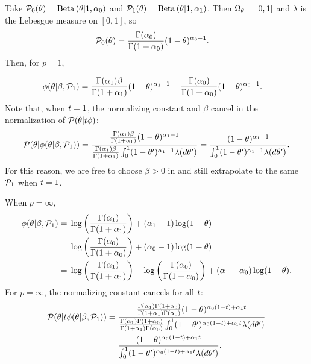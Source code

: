 \begin{ex}
%
Take $\mathcal{P}_{0}(\theta) = \mathrm{Beta}\left(\theta \vert 1, \alpha_0\right)$ and
$\mathcal{P}_{1}(\theta) = \mathrm{Beta}\left(\theta \vert 1, \alpha_1\right)$.  Then
$\Omega_{\theta}=[0,1]$ and $\lambda$ is the Lebesgue measure on $[0,1]$, so
%
\begin{align*}
%
\pbase(\theta) ={}&
    \frac{\Gamma(\alpha_0)}{\Gamma(1 + \alpha_0)} (1 - \theta)^{\alpha_0 - 1}.
%
\end{align*}
%
Then, for $p = 1$,

\begin{align*}
%
\phi(\theta \vert \beta, \palt) ={}&
    \frac{\Gamma(\alpha_1)\beta}{\Gamma(1 + \alpha_1)} (1 - \theta)^{\alpha_1 - 1} -
    \frac{\Gamma(\alpha_0)}{\Gamma(1 + \alpha_0)}
        (1 - \theta)^{\alpha_0 - 1}.
%
\end{align*}
%
Note that, when $t = 1$, the normalizing constant and $\beta$ cancel in the
normalization of $\mathcal{P}(\theta \vert t \phi)$:
%
\begin{align*}
%
\p(\theta \vert \phi(\theta \vert \beta, \palt)) =
\frac{\frac{\Gamma(\alpha_1)\beta}{\Gamma(1 + \alpha_1)} (1 - \theta)^{\alpha_1 - 1}}
     {\frac{\Gamma(\alpha_1)\beta}{\Gamma(1 + \alpha_1)}
       \int_0^1 (1 - \theta')^{\alpha_1 - 1} \lambda(d\theta')}
=
\frac{(1 - \theta)^{\alpha_1 - 1}}
     {\int_0^1 (1 - \theta')^{\alpha_1 - 1} \lambda(d\theta')}.
%
\end{align*}
%
For this reason, we are free to choose $\beta > 0$ in 
and still extrapolate to the same $\mathcal{P}_{1}$ when $t = 1$.

When $p = \infty$,
%
\begin{align*}
%
\phi(\theta \vert \beta, \palt) ={}&
    \log \left(
        \frac{\Gamma(\alpha_1) }{\Gamma(1 + \alpha_1)}
    \right)  + (\alpha_1 - 1) \log (1 - \theta) - \\
{}&
    \log \left(
        \frac{\Gamma(\alpha_0)}{\Gamma(1 + \alpha_0)}
    \right) + (\alpha_0 - 1) \log (1 - \theta) \\
={}&
\log \left(
    \frac{\Gamma(\alpha_1) }{\Gamma(1 + \alpha_1)}
\right) -
\log \left(
    \frac{\Gamma(\alpha_0)}{\Gamma(1 + \alpha_0)}
\right) + (\alpha_1 - \alpha_0) \log(1 - \theta).
%
\end{align*}
%
For $p = \infty$, the normalizing constant cancels for all $t$:
%
\begin{align*}
%
\p(\theta \vert \t \phi(\theta \vert \beta, \palt)) ={}&
\frac{    \frac{\Gamma(\alpha_1) \Gamma(1 + \alpha_0) }
               {\Gamma(1 + \alpha_1) \Gamma(\alpha_0)}
        (1-\theta)^{\alpha_0 (1 - \t) + \alpha_1 \t}
    }
     {
     \frac{\Gamma(\alpha_1) \Gamma(1 + \alpha_0) }
          {\Gamma(1 + \alpha_1) \Gamma(\alpha_0)}
             \int_0^1 (1-\theta')^{\alpha_0 (1 - \t) +
                                   \alpha_1 \t} \lambda(d\theta')
     }
\\={}&
\frac{(1-\theta)^{\alpha_0 (1 - \t) + \alpha_1 \t}}
     {\int_0^1 (1-\theta')^{\alpha_0 (1 - \t) + \alpha_1 \t} \lambda(d\theta')}.
%
\end{align*}
%
\end{ex}


